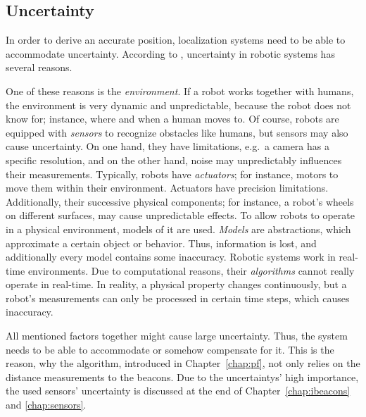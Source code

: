 \subsection{Uncertainty}
In order to derive an accurate position, localization systems need to be able to accommodate uncertainty. According to \citet{thrun:prob_robo}, uncertainty in robotic systems has several reasons.

One of these reasons is the \emph{environment}. If a robot works together with humans, the environment is very dynamic and unpredictable, because the robot does not know for; instance, where and when a human moves to.
Of course, robots are equipped with \emph{sensors} to recognize obstacles like humans, but sensors may also cause uncertainty. On one hand, they have limitations, e.g.\ a camera has a specific resolution, and on the other hand, noise may unpredictably influences their measurements. 
Typically, robots have \emph{actuators}; for instance, motors to move them within their environment. Actuators have precision limitations. Additionally, their successive physical components; for instance, a robot's wheels on different surfaces, may cause unpredictable effects.
To allow robots to operate in a physical environment, models of it are used. \emph{Models} are abstractions, which approximate a certain object or behavior. Thus, information is lost, and additionally every model contains some inaccuracy. Robotic systems work in real-time environments. Due to computational reasons, their \emph{algorithms} cannot really operate in real-time. In reality, a physical property changes continuously, but a robot's measurements can only be processed in certain time steps, which causes inaccuracy. 

All mentioned factors together might cause large uncertainty. Thus, the system needs to be able to accommodate or somehow compensate for it. This is the reason, why the algorithm, introduced in Chapter~\ref{chap:pf}, not only relies on the distance measurements to the beacons. Due to the uncertaintys' high importance, the used sensors' uncertainty is discussed at the end of Chapter~\ref{chap:ibeacons} and \ref{chap:sensors}.

